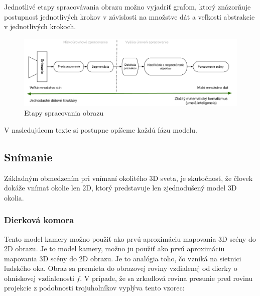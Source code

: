 Jednotlivé etapy spracovávania obrazu možno vyjadriť grafom, ktorý znázorňuje postupnosť jednotlivých krokov v závislosti na množstve dát a veľkosti abstrakcie v jednotlivých krokoch. 

\begin{figure}[H]
\begin{center}
	\includegraphics[scale=0.45]{obrazky/etapy}
	\caption{Etapy spracovania obrazu}
	\end{center}
\end{figure}

V nasledujúcom texte si postupne opíšeme každú fázu modelu. 


\subsection{Snímanie}
Základným obmedzením pri vnímaní okolitého 3D sveta, je skutočnosť, že človek dokáže vnímať okolie len 2D, ktorý predstavuje len zjednodušený model 3D okolia.


\subsubsection{Dierková komora}Tento model kamery možno použiť ako prvú aproximáciu mapovania 3D scény do 2D obrazu. Je to model kamery, možno ju použiť ako prvú aproximáciu mapovania 3D scény do 2D obrazu. Je to analógia toho, čo vzniká na sietnici ľudského oka. Obraz sa premieta do obrazovej roviny vzdialenej od dierky o ohniskovej vzdialenosti $f$. V prípade, že sa zrkadlová rovina presunie pred rovinu projekcie z podobnosti trojuholníkov vyplýva tento vzorec:


